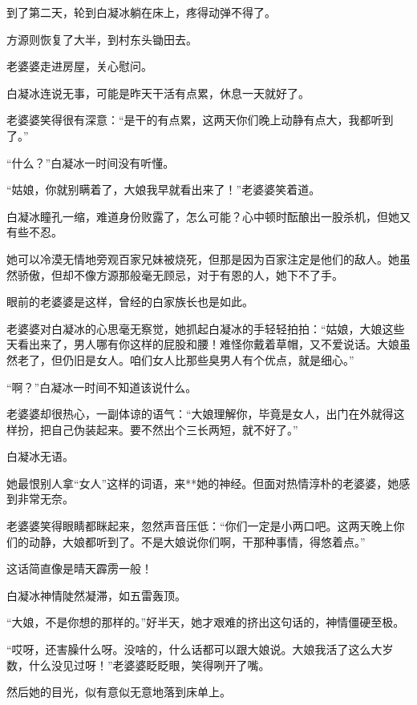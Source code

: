 
\begin{this_body}

到了第二天，轮到白凝冰躺在床上，疼得动弹不得了。

方源则恢复了大半，到村东头锄田去。

老婆婆走进房屋，关心慰问。

白凝冰连说无事，可能是昨天干活有点累，休息一天就好了。

老婆婆笑得很有深意：“是干的有点累，这两天你们晚上动静有点大，我都听到了。”

“什么？”白凝冰一时间没有听懂。

“姑娘，你就别瞒着了，大娘我早就看出来了！”老婆婆笑着道。

白凝冰瞳孔一缩，难道身份败露了，怎么可能？心中顿时酝酿出一股杀机，但她又有些不忍。

她可以冷漠无情地旁观百家兄妹被烧死，但那是因为百家注定是他们的敌人。她虽然骄傲，但却不像方源那般毫无顾忌，对于有恩的人，她下不了手。

眼前的老婆婆是这样，曾经的白家族长也是如此。

老婆婆对白凝冰的心思毫无察觉，她抓起白凝冰的手轻轻拍拍：“姑娘，大娘这些天看出来了，男人哪有你这样的屁股和腰！难怪你戴着草帽，又不爱说话。大娘虽然老了，但仍旧是女人。咱们女人比那些臭男人有个优点，就是细心。”

“啊？”白凝冰一时间不知道该说什么。

老婆婆却很热心，一副体谅的语气：“大娘理解你，毕竟是女人，出门在外就得这样扮，把自己伪装起来。要不然出个三长两短，就不好了。”

白凝冰无语。

她最恨别人拿“女人”这样的词语，来**她的神经。但面对热情淳朴的老婆婆，她感到非常无奈。

老婆婆笑得眼睛都眯起来，忽然声音压低：“你们一定是小两口吧。这两天晚上你们的动静，大娘都听到了。不是大娘说你们啊，干那种事情，得悠着点。”

这话简直像是晴天霹雳一般！

白凝冰神情陡然凝滞，如五雷轰顶。

“大娘，不是你想的那样的。”好半天，她才艰难的挤出这句话的，神情僵硬至极。

“哎呀，还害臊什么呀。没啥的，什么话都可以跟大娘说。大娘我活了这么大岁数，什么没见过呀！”老婆婆眨眨眼，笑得咧开了嘴。

然后她的目光，似有意似无意地落到床单上。


\end{this_body}
